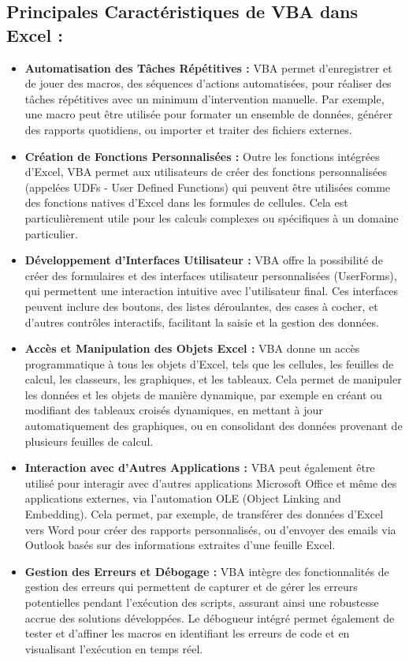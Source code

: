 \documentclass[a4paper, oneside, 12pt, final]{extreport}
\begin{document}
\subsection{Principales Caractéristiques de VBA dans Excel :}
\begin{itemize}
\item \textbf{Automatisation des Tâches Répétitives :} VBA permet d'enregistrer et de jouer des macros, des séquences d'actions automatisées, pour réaliser des tâches répétitives avec un minimum d'intervention manuelle. Par exemple, une macro peut être utilisée pour formater un ensemble de données, générer des rapports quotidiens, ou importer et traiter des fichiers externes.

\item \textbf{Création de Fonctions Personnalisées :} Outre les fonctions intégrées d'Excel, VBA permet aux utilisateurs de créer des fonctions personnalisées (appelées UDFs - User Defined Functions) qui peuvent être utilisées comme des fonctions natives d'Excel dans les formules de cellules. Cela est particulièrement utile pour les calculs complexes ou spécifiques à un domaine particulier.

\item \textbf{Développement d'Interfaces Utilisateur :} VBA offre la possibilité de créer des formulaires et des interfaces utilisateur personnalisées (UserForms), qui permettent une interaction intuitive avec l'utilisateur final. Ces interfaces peuvent inclure des boutons, des listes déroulantes, des cases à cocher, et d'autres contrôles interactifs, facilitant la saisie et la gestion des données.

\item \textbf{Accès et Manipulation des Objets Excel :} VBA donne un accès programmatique à tous les objets d'Excel, tels que les cellules, les feuilles de calcul, les classeurs, les graphiques, et les tableaux. Cela permet de manipuler les données et les objets de manière dynamique, par exemple en créant ou modifiant des tableaux croisés dynamiques, en mettant à jour automatiquement des graphiques, ou en consolidant des données provenant de plusieurs feuilles de calcul.

\item \textbf{Interaction avec d'Autres Applications :} VBA peut également être utilisé pour interagir avec d'autres applications Microsoft Office et même des applications externes, via l'automation OLE (Object Linking and Embedding). Cela permet, par exemple, de transférer des données d'Excel vers Word pour créer des rapports personnalisés, ou d'envoyer des emails via Outlook basés sur des informations extraites d'une feuille Excel.

\item \textbf{Gestion des Erreurs et Débogage :} VBA intègre des fonctionnalités de gestion des erreurs qui permettent de capturer et de gérer les erreurs potentielles pendant l'exécution des scripts, assurant ainsi une robustesse accrue des solutions développées. Le débogueur intégré permet également de tester et d'affiner les macros en identifiant les erreurs de code et en visualisant l'exécution en temps réel.
\end{itemize}
\end{document}
